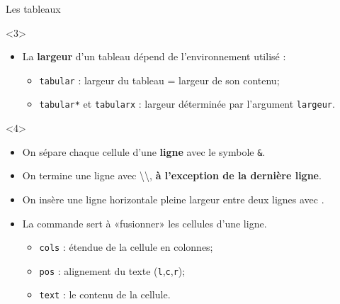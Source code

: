 \begin{frame}[fragile]{Les tableaux}
	\begin{onlyenv}
		\begin{itemize}
			\item La \textbf{largeur} d'un tableau dépend de l'environnement utilisé :
			\begin{itemize}
				\scriptsize
				\item \texttt{tabular} : largeur du tableau = largeur de son contenu;
				\item \texttt{tabular*} et \texttt{tabularx} : largeur déterminée par l'argument 
					\texttt{largeur}.
			\end{itemize}
		\end{itemize}
	\end{onlyenv}

	\begin{onlyenv}
		\begin{itemize}
			\item On sépare chaque cellule d'une \textbf{ligne} avec le symbole \texttt{\&}.
			\item On termine une ligne avec \textbackslash\textbackslash, \textbf{à l'exception de la dernière ligne}.
			\item On insère une ligne horizontale pleine largeur entre deux lignes avec .
			\item La commande  sert à «fusionner» les cellules d'une ligne.
			\begin{itemize}
				\scriptsize
				\item \texttt{cols} : étendue de la cellule en colonnes;
				\item \texttt{pos} : alignement du texte (\texttt{l},\texttt{c},\texttt{r});
				\item \texttt{text} : le contenu de la cellule.
			\end{itemize}
		\end{itemize}
	\end{onlyenv}
	
\end{frame}

